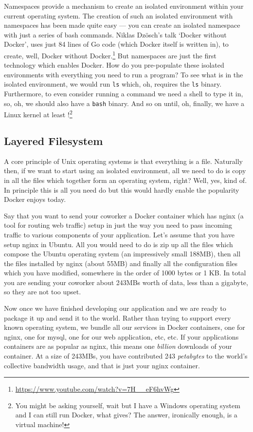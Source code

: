 Namespaces provide a mechanism to create an isolated environment within your current operating system.
The creation of such an isolated environment with namespaces has been made quite easy --- you can create an isolated namespace with just a series of bash commands.
Niklas Dz{\"o}sch's talk `Docker without Docker', uses just 84 lines of Go code (which Docker itself is written in),
to create, well, Docker without Docker.\footnote{\url{https://www.youtube.com/watch?v=7H__eF6hvWg}}
But namespaces are just the first technology which enables Docker.
How do you pre-populate these isolated environments with everything you need to run a program?
To see what is in the isolated environment, we would run \texttt{ls} which, oh, requires the \texttt{ls} binary.
Furthermore, to even consider running a command we need a shell to type it in, so, oh, we should also have a \texttt{bash} binary.
And so on until, oh, finally, we have a Linux kernel at least%
!\footnote{You might be asking yourself, wait but I have a Windows operating system and I can still run Docker, what gives? The answer, ironically enough, is a virtual machine!}

\subsection{Layered Filesystem}
A core principle of Unix operating systems is that everything is a file.
Naturally then, if we want to start using an isolated environment,
all we need to do is copy in all the files which together form an operating system, right?
Well, yes, kind of.
In principle this is all you need do but this would hardly enable the popularity Docker enjoys today.

Say that you want to send your coworker a Docker container which has nginx (a tool for routing web traffic)
setup in just the way you need to pass incoming traffic to various components of your application.
Let's assume that you have setup nginx in Ubuntu.
All you would need to do is zip up all the files which compose the Ubuntu operating system (an impressively small 188MB),
then all the files installed by nginx (about 55MB) and finally all the configuration files which you have modified,
somewhere in the order of 1000 bytes or 1 KB.
In total you are sending your coworker about 243MBs worth of data, less than a gigabyte, so they are not too upset.

Now once we have finished developing our application and we are ready to package it up and send it to the world.
Rather than trying to support every known operating system, we bundle all our services in Docker containers,
one for nginx, one for mysql, one for our web application, etc, etc.
If your applications containers are as popular as nginx, this means one \textit{billion} downloads of your container.
At a size of 243MBs, you have contributed 243 \textit{petabytes} to the world's collective bandwidth usage, and that is just your nginx container.

